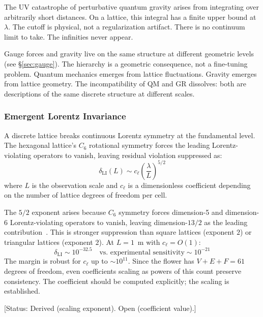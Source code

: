 \documentclass[12pt,a4paper]{article}
\theoremstyle{plain}
\theoremstyle{definition}
\newcommand{\elabel}[1]{\textsf{\small [#1]}}
\begin{document}
The UV catastrophe of perturbative quantum gravity arises from integrating over arbitrarily short distances. On a lattice, this integral has a finite upper bound at $\lambda$. The cutoff is physical, not a regularization artifact. There is no continuum limit to take. The infinities never appear.

Gauge forces and gravity live on the same structure at different geometric levels (see \S\ref{sec:gauge}). The hierarchy is a geometric consequence, not a fine-tuning problem. Quantum mechanics emerges from lattice fluctuations. Gravity emerges from lattice geometry. The incompatibility of QM and GR dissolves: both are descriptions of the same discrete structure at different scales.

\subsubsection{Emergent Lorentz Invariance}\label{sec:lorentz}

A discrete lattice breaks continuous Lorentz symmetry at the fundamental level. The hexagonal lattice's $C_6$ rotational symmetry forces the leading Lorentz-violating operators to vanish, leaving residual violation suppressed as:
\begin{equation}\label{eq:lorentz}
\delta_{\mathrm{LI}}(L) \sim c_\ell \left(\frac{\lambda}{L}\right)^{5/2}
\end{equation}
where $L$ is the observation scale and $c_\ell$ is a dimensionless coefficient depending on the number of lattice degrees of freedom per cell.

The $5/2$ exponent arises because $C_6$ symmetry forces dimension-5 and dimension-6 Lorentz-violating operators to vanish, leaving dimension-$13/2$ as the leading contribution~\cite{Kostelecky2011}. This is stronger suppression than square lattices (exponent $2$) or triangular lattices (exponent $2$). At $L = 1$~m with $c_\ell = O(1)$:
\begin{equation}
\delta_{\mathrm{LI}} \sim 10^{-32.5} \quad \text{vs.\ experimental sensitivity} \sim 10^{-21}
\end{equation}
The margin is robust for $c_\ell$ up to $\sim 10^{11}$. Since the flower has $V + E + F = 61$ degrees of freedom, even coefficients scaling as powers of this count preserve consistency. The coefficient should be computed explicitly; the scaling is established.

\elabel{Status: Derived (scaling exponent). Open (coefficient value).}
\end{document}

